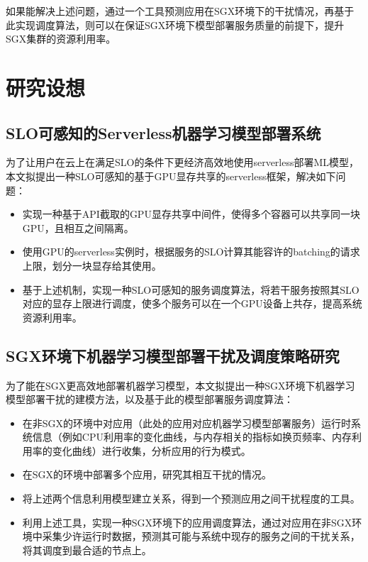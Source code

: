 如果能解决上述问题，通过一个工具预测应用在SGX环境下的干扰情况，再基于此实现调度算法，则可以在保证SGX环境下模型部署服务质量的前提下，提升SGX集群的资源利用率。


\section{研究设想}

\subsection{SLO可感知的Serverless机器学习模型部署系统}
为了让用户在云上在满足SLO的条件下更经济高效地使用serverless部署ML模型，本文拟提出一种SLO可感知的基于GPU显存共享的serverless框架，解决如下问题：
\begin{itemize}
    \item 实现一种基于API截取的GPU显存共享中间件，使得多个容器可以共享同一块GPU，且相互之间隔离。
    \item 使用GPU的serverless实例时，根据服务的SLO计算其能容许的batching的请求上限，划分一块显存给其使用。
    \item 基于上述机制，实现一种SLO可感知的服务调度算法，将若干服务按照其SLO对应的显存上限进行调度，使多个服务可以在一个GPU设备上共存，提高系统资源利用率。
\end{itemize}

\subsection{SGX环境下机器学习模型部署干扰及调度策略研究}
为了能在SGX更高效地部署机器学习模型，本文拟提出一种SGX环境下机器学习模型部署干扰的建模方法，以及基于此的模型部署服务调度算法：
\begin{itemize}
    \item 在非SGX的环境中对应用（此处的应用对应机器学习模型部署服务）运行时系统信息（例如CPU利用率的变化曲线，与内存相关的指标如换页频率、内存利用率的变化曲线）进行收集，分析应用的行为模式。
    \item 在SGX的环境中部署多个应用，研究其相互干扰的情况。
    \item 将上述两个信息利用模型建立关系，得到一个预测应用之间干扰程度的工具。
    \item 利用上述工具，实现一种SGX环境下的应用调度算法，通过对应用在非SGX环境中采集少许运行时数据，预测其可能与系统中现存的服务之间的干扰关系，将其调度到最合适的节点上。
\end{itemize}

